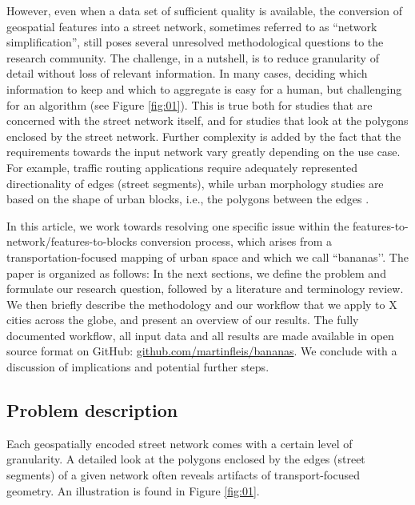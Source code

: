 However, even when a data set of sufficient quality is available, the conversion of geospatial features into a street network, sometimes referred to as ``network simplification'', still poses several unresolved methodological questions to the research community. The challenge, in a nutshell, is to reduce granularity of detail without loss of relevant information. In many cases, deciding which information to keep and which to aggregate is easy for a human, but challenging for an algorithm (see Figure \ref{fig:01}). This is true both for studies that are concerned with the street network itself, and for studies that look at the polygons enclosed by the street network. Further complexity is added by the fact that the requirements towards the input network vary greatly depending on the use case. For example, traffic routing applications require adequately represented directionality of edges (street segments), while urban morphology studies are based on the shape of urban blocks, i.e., the polygons between the edges \cite{dibble_origin_2019}. 
    
In this article, we work towards resolving one specific issue within the features-to-network/features-to-blocks conversion process, which arises from a transportation-focused mapping of urban space and which we call ``bananas’’. The paper is organized as follows: In the next sections, we define the problem and formulate our research question, followed by a literature and terminology review. We then briefly describe the methodology and our workflow that we apply to X cities across the globe, and present an overview of our results. The fully documented workflow, all input data and all results are made available in open source format on GitHub: \href{https://github.com/martinfleis/bananas}{github.com/martinfleis/bananas}. We conclude with a discussion of implications and potential further steps. 

\subsection*{Problem description}
Each geospatially encoded street network comes with a certain level of granularity. A detailed look at the polygons enclosed by the edges (street segments) of a given network often reveals artifacts of transport-focused geometry. An illustration is found in Figure \ref{fig:01}. 

